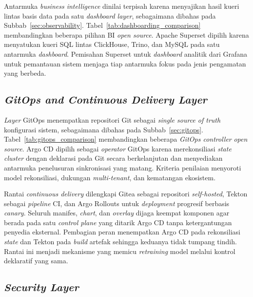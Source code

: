 

Antarmuka \textit{business intelligence} dinilai terpisah karena menyajikan hasil kueri lintas basis data pada satu \textit{dashboard layer}, sebagaimana dibahas pada Subbab~\ref{sec:observability}. Tabel~\ref{tab:dashboarding_comparison} membandingkan beberapa pilihan BI \textit{open source}. Apache Superset dipilih karena menyatukan kueri SQL lintas ClickHouse, Trino, dan MySQL pada satu antarmuka \textit{dashboard}. Pemisahan Superset untuk \textit{dashboard} analitik dari Grafana untuk pemantauan sistem menjaga tiap antarmuka fokus pada jenis pengamatan yang berbeda.



\subsection{\textit{GitOps and Continuous Delivery Layer}}
\label{subsec:pilih-gitops}

\textit{Layer} GitOps menempatkan repositori Git sebagai \textit{single source of truth} konfigurasi sistem, sebagaimana dibahas pada Subbab~\ref{sec:gitops}. Tabel~\ref{tab:gitops_comparison} membandingkan beberapa \textit{GitOps controller} \textit{open source}. Argo CD dipilih sebagai \textit{operator} GitOps karena merekonsiliasi \textit{state} \textit{cluster} dengan deklarasi pada Git secara berkelanjutan dan menyediakan antarmuka penelusuran sinkronisasi yang matang. Kriteria penilaian menyoroti model rekonsiliasi, dukungan \textit{multi-tenant}, dan kematangan ekosistem.

Rantai \textit{continuous delivery} dilengkapi Gitea sebagai repositori \textit{self-hosted}, Tekton sebagai \textit{pipeline} CI, dan Argo Rollouts untuk \textit{deployment} progresif berbasis \textit{canary}. Seluruh manifes, \textit{chart}, dan \textit{overlay} dijaga keempat komponen agar berada pada satu \textit{control plane} yang ditarik Argo CD tanpa ketergantungan penyedia eksternal. Pembagian peran menempatkan Argo CD pada rekonsiliasi \textit{state} dan Tekton pada \textit{build} artefak sehingga keduanya tidak tumpang tindih. Rantai ini menjadi mekanisme yang memicu \textit{retraining} model melalui kontrol deklaratif yang sama.



\subsection{\textit{Security Layer}}
\label{subsec:pilih-keamanan}

